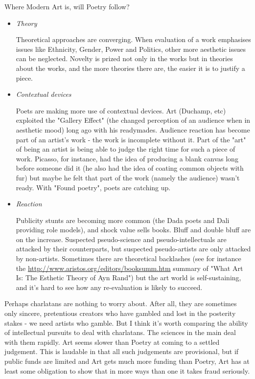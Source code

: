 \documentclass[11pt]{article}
\begin{document}
Where Modern Art is, will Poetry follow?
\begin{itemize}
\item \textit{Theory}

 Theoretical approaches are 
converging.
 When evaluation of a work emphasises issues like Ethnicity, Gender, Power
and Politics, other more aesthetic issues can be neglected. Novelty is
prized not only in the works but in theories about the works, and the more
theories there are, the easier it is to justify a piece.
\item \textit{Contextual devices}

Poets
are making more use of contextual devices.
 Art (Duchamp, etc) exploited the "Gallery
  Effect" (the changed perception of an audience when in aesthetic mood)
  long ago with his readymades.
  Audience reaction has become part of an artist's work - the work is
  incomplete without it. Part of the "art" of being an artist is being
  able to judge the right time for such a piece of work. Picasso, for
  instance, had the idea of producing a blank canvas long before someone
  did it (he also had the idea of coating common objects with fur) but
  maybe he felt that part of the work (namely the audience) wasn't ready.
With "Found poetry", poets are catching up. 
\item \textit{Reaction}

Publicity stunts are becoming more
common (the Dada poets and Dali providing role models), and shock value 
sells books. Bluff and double bluff are on
the increase. Suspected pseudo-science and pseudo-intellectuals are attacked 
by their counterparts, but suspected pseudo-artists are only attacked by
non-artists. Sometimes there are theoretical backlashes (see for
instance the \url{http://www.aristos.org/editors/booksumm.htm} summary
of "What Art Is: The Esthetic Theory of Ayn Rand") but the art world is
self-sustaining, and it's hard to see how any re-evaluation is likely
to succeed. 
\end{itemize}

Perhaps charlatans are nothing to worry about. After all, they
are sometimes only sincere, pretentious creators who have gambled and lost
in the posterity stakes - we need artists who gamble. But I think it's 
worth comparing the ability of intellectual pursuits to deal 
with charlatans. The sciences in the main deal with them rapidly. Art
seems slower than Poetry at coming to a settled judgement. This is laudable
in that all such judgements are provisional, but if public funds are limited
and Art gets much more funding than Poetry, Art has at least some obligation
to show that in more ways than one it takes fraud seriously. 
\end{document}
